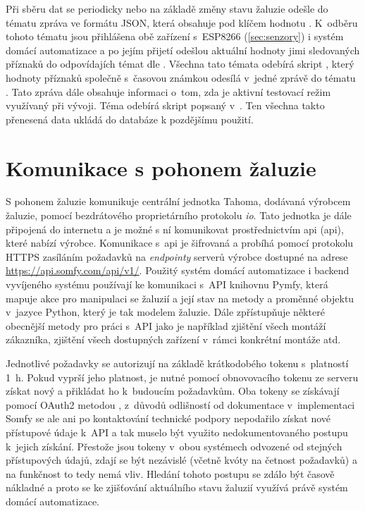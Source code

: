     Při sběru dat se periodicky nebo na základě změny stavu žaluzie odešle do tématu  zpráva ve formátu JSON, která obsahuje pod klíčem  hodnotu . K~odběru tohoto tématu jsou přihlášena obě zařízení s~ESP8266 (\cref{sec:senzory}) i systém domácí automatizace a po jejím přijetí odešlou aktuální hodnoty jimi sledovaných příznaků do odpovídajích témat dle . Všechna tato témata odebírá skript , který hodnoty příznaků společně s~časovou známkou odesílá v~jedné zprávě do tématu . Tato zpráva dále obsahuje informaci o~tom, zda je aktivní testovací režim využívaný při vývoji. Téma  odebírá skript  popsaný v~. Ten všechna takto přenesená data ukládá do databáze k pozdějšímu použití.
  
  \section{Komunikace s pohonem žaluzie}
    S pohonem žaluzie komunikuje centrální jednotka Tahoma, dodávaná výrobcem žaluzie, pomocí bezdrátového proprietárního protokolu \emph{io}. Tato jednotka je dále připojená do internetu a je možné s ní komunikovat prostřednictvím \acrlong{api} (\acrshort{api}), které nabízí výrobce. Komunikace s~\acrshort{api} je šifrovaná a probíhá pomocí protokolu HTTPS zasíláním požadavků na \emph{endpointy} serverů výrobce dostupné na adrese \href{https://api.somfy.com/api/v1/}{https://api.somfy.com/api/v1/}. Použitý systém domácí automatizace i backend vyvíjeného systému používají ke komunikaci s~API knihovnu Pymfy, která mapuje akce pro manipulaci se žaluzií a její stav na metody a proměnné objektu v~jazyce Python, který je tak modelem žaluzie. Dále zpřístupňuje některé obecnější metody pro práci s~API jako je například zjištění všech montáží zákazníka, zjištění všech dostupných zařízení v~rámci konkrétní montáže atd.

    Jednotlivé požadavky se autorizují na základě krátkodobého tokenu s~platností 1~h. Pokud vyprší jeho platnost, je nutné pomocí obnovovacího tokenu ze serveru získat nový a přikládat ho k~budoucím požadavkům. Oba tokeny se získávají pomocí OAuth2 metodou , z~důvodů odlišností od dokumentace v~implementaci Somfy se ale ani po kontaktování technické podpory nepodařilo získat nové přístupové údaje k~API a tak muselo být využito nedokumentovaného postupu k~jejich získání. Přestože jsou tokeny v~obou systémech odvozené od stejných přístupových údajů, zdají se být nezávislé (včetně kvóty na četnost požadavků) a na funkčnost to tedy nemá vliv. Hledání tohoto postupu se zdálo být časově nákladné a proto se ke zjišťování aktuálního stavu žaluzií využívá právě systém domácí automatizace.

